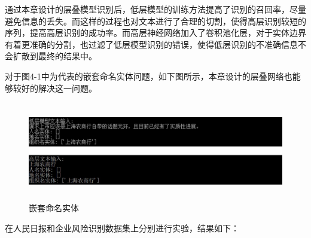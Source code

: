 \documentclass[winfonts,master,oneside,nobackinfo]{njuthesis}
\begin{document}
通过本章设计的层叠模型识别后，低层模型的训练方法提高了识别的召回率，尽量避免信息的丢失。而这样的过程也对文本进行了合理的切割，使得高层识别较短的序列，提高高层识别的成功率。而高层神经网络加入了卷积池化层，对于实体边界有着更准确的分割，也过滤了低层模型识别的错误，使得低层识别的不准确信息不会扩散到最终的结果中。

对于图4-1中为代表的嵌套命名实体问题，如下图所示，本章设计的层叠网络也能够较好的解决这一问题。

\begin{figure}[H]
\centering
\begin{minipage}[t]{\textwidth}
\includegraphics[width=1\textwidth,height=4.3cm]{./figure/层叠模型嵌套命名实体.jpg}
\caption{嵌套命名实体}
\label{lab:1}
\end{minipage}
\end{figure}

在人民日报和企业风险识别数据集上分别进行实验，结果如下：
\end{document}
